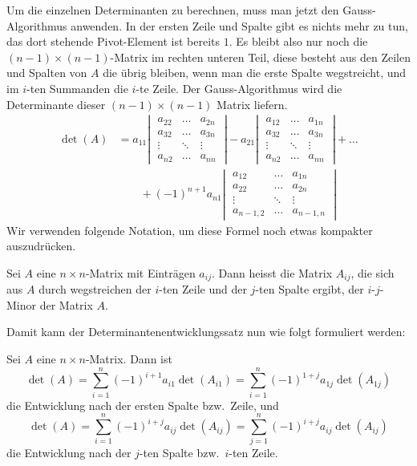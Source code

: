 Um die einzelnen Determinanten zu berechnen, muss man jetzt 
den Gauss-Algorithmus anwenden.
In der ersten Zeile und Spalte
gibt es nichts mehr zu tun, das dort stehende Pivot-Element ist
bereits $1$.
Es bleibt also nur noch die $(n-1)\times(n-1)$-Matrix
im rechten unteren Teil, diese besteht aus den Zeilen und Spalten
von $A$ die übrig bleiben, wenn man die erste Spalte wegstreicht,
und im $i$-ten Summanden die $i$-te Zeile.
Der Gauss-Algorithmus wird
die Determinante dieser $(n-1)\times(n-1)$ Matrix liefern.
\begin{align*}
\det(A)
&=
a_{11}
\left|\;
\begin{matrix}
a_{22}&\dots&a_{2n}\\
a_{32}&\dots&a_{3n}\\
\vdots&\ddots&\vdots\\
a_{n2}&\dots&a_{nn}
\end{matrix}
\;\right|
-a_{21}
\left|\;
\begin{matrix}
a_{12}&\dots&a_{1n}\\
a_{32}&\dots&a_{3n}\\
\vdots&\ddots&\vdots\\
a_{n2}&\dots&a_{nn}
\end{matrix}
\;\right|
+\dots
\\
&\qquad
+(-1)^{n+1}a_{n1}
\left|\;
\begin{matrix}
a_{12}&\dots&a_{1n}\\
a_{22}&\dots&a_{2n}\\
\vdots&\ddots&\vdots\\
a_{n-1,2}&\dots&a_{n-1,n}
\end{matrix}
\;\right|
\end{align*}
Wir verwenden folgende Notation, um diese Formel noch etwas kompakter
auszudrücken.
\begin{definition}Sei $A$ eine $n\times n$-Matrix mit Einträgen $a_{ij}$.
Dann heisst die Matrix $A_{ij}$, die sich aus $A$ durch wegstreichen
der $i$-ten Zeile und der $j$-ten Spalte ergibt, der $i$-$j$-Minor der
Matrix $A$.
\end{definition}
Damit kann der Determinantenentwicklungssatz nun wie folgt formuliert
werden:
\begin{satz}
Sei $A$ eine $n\times n$-Matrix.
Dann ist
\[
\det(A)=
\sum_{i=1}^n(-1)^{i+1}a_{i1}\det(A_{i1})
=
\sum_{i=1}^n(-1)^{1+j}a_{1j}\det(A_{1j})
\]
die Entwicklung nach der ersten Spalte bzw.~Zeile, und 
\[
\det(A)=
\sum_{i=1}^n(-1)^{i+j}a_{ij}\det(A_{ij})
=
\sum_{j=1}^n(-1)^{i+j}a_{ij}\det(A_{ij})
\]
die Entwicklung nach der $j$-ten Spalte bzw.~$i$-ten Zeile. 
\end{satz}

